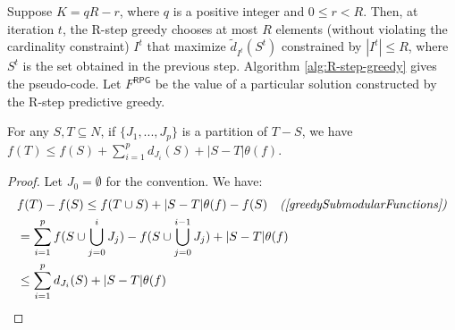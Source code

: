 Suppose $K = q R - r$, where $q$ is a positive integer and $0 \leq r < R$. Then, at iteration $t$, the R-step greedy chooses at most $R$ elements (without violating the cardinality constraint) $I^t$ that maximize $\tilde{d}_{I^t}(S^t)$ constrained by $|I^t| \leq R$, where $S^t$ is the set obtained in the previous step. Algorithm \ref{alg:R-step-greedy} gives the pseudo-code. 
Let $F^{\textsf{RPG}}$ be the value of a particular solution constructed by the R-step predictive greedy. 


\begin{lemma} \label{lem:general-bound-property}
For any $S, T \subseteq N$, if $\{ J_1, ..., J_p \}$ is a partition of $T - S$, we have 
$f(T) \leq f(S) + \sum_{i = 1}^{p}{d_{J_i}(S)} + |S-T| \theta(f)$.
\end{lemma}
\begin{proof}
Let $J_0 = \emptyset$ for the convention. We have:
\begin{align*}
&f(T) - f(S) \leq f(T \cup S) + |S-T| \theta(f) - f(S) \quad \textit{(\cite{greedySubmodularFunctions})} \\
&= \sum_{i=1}^{p}{f(S \cup \bigcup_{j=0}^{i}{J_j}) - f(S \cup \bigcup_{j=0}^{i-1}{J_j})} + |S-T| \theta(f) \\
&\leq \sum_{i = 1}^{p}{d_{J_i}(S)} + |S-T| \theta(f) \qedhere
\end{align*}
\end{proof}

